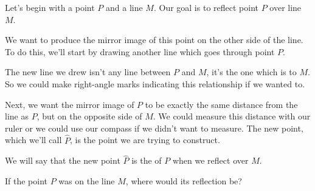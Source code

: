\documentclass{ximera}
\begin{document}
\begin{example}
	Let's begin with a point $P$ and a line $M$. Our goal is to reflect point $P$ over line $M$.
\begin{image}
\end{image}
We want to produce the mirror image of this point on the other side of the line. To do this, we'll start by drawing another line which goes through point $P$.
\begin{image}
\end{image}
The new line we drew isn't any line between $P$ and $M$, it's the one which is  to $M$. So we could make right-angle marks indicating this relationship if we wanted to.

Next, we want the mirror image of $P$ to be exactly the same distance from the line as $P$, but on the opposite side of $M$. We could measure this distance with our ruler or we could use our compass if we didn't want to measure. The new point, which we'll call $\hat{P}$, is the point we are trying to construct.
\begin{image}
\end{image}

\end{example}
We will say that the new point $\hat{P}$ is the  of $P$ when we reflect over $M$.
\begin{question}
If the point $P$ was on the line $M$, where would its reflection be?
\begin{multipleChoice}
\end{multipleChoice}
\end{question}
\end{document}
